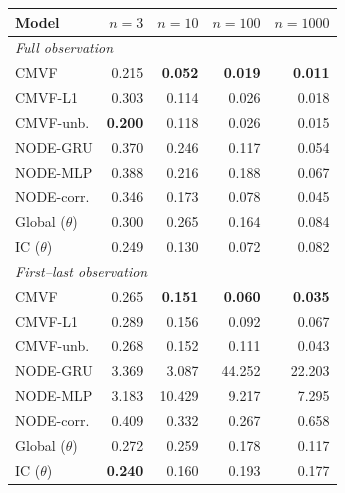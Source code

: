 \begin{tabular}{lrrrr}
\toprule
Model & $n{=}3$ & $n{=}10$ & $n{=}100$ & $n{=}1000$ \\
\midrule
\multicolumn{5}{l}{\emph{Full observation}} \\
CMVF & 0.215 & \textbf{0.052} & \textbf{0.019} & \textbf{0.011} \\
CMVF-L1 & 0.303 & 0.114 & 0.026 & 0.018 \\
CMVF-unb. & \textbf{0.200} & 0.118 & 0.026 & 0.015 \\
NODE-GRU & 0.370 & 0.246 & 0.117 & 0.054 \\
NODE-MLP & 0.388 & 0.216 & 0.188 & 0.067 \\
NODE-corr. & 0.346 & 0.173 & 0.078 & 0.045 \\
Global ($\theta$) & 0.300 & 0.265 & 0.164 & 0.084 \\
IC ($\theta$) & 0.249 & 0.130 & 0.072 & 0.082 \\
\midrule
\multicolumn{5}{l}{\emph{First--last observation}} \\
CMVF & 0.265 & \textbf{0.151} & \textbf{0.060} & \textbf{0.035} \\
CMVF-L1 & 0.289 & 0.156 & 0.092 & 0.067 \\
CMVF-unb. & 0.268 & 0.152 & 0.111 & 0.043 \\
NODE-GRU & 3.369 & 3.087 & 44.252 & 22.203 \\
NODE-MLP & 3.183 & 10.429 & 9.217 & 7.295 \\
NODE-corr. & 0.409 & 0.332 & 0.267 & 0.658 \\
Global ($\theta$) & 0.272 & 0.259 & 0.178 & 0.117 \\
IC ($\theta$) & \textbf{0.240} & 0.160 & 0.193 & 0.177 \\
\bottomrule
\end{tabular}

